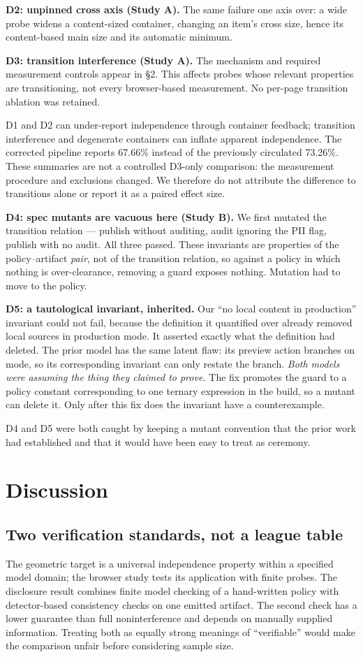 \documentclass[acmsmall,screen,review,anonymous,nonacm]{acmart}
\begin{document}
\textbf{D2: unpinned cross axis (Study A).} The same failure one axis over: a wide probe widens a content-sized container, changing an item's cross size, hence its content-based main size and its automatic minimum.

\textbf{D3: transition interference (Study A).} The mechanism and required measurement controls appear in \S2. This affects probes whose relevant properties are transitioning, not every browser-based measurement. No per-page transition ablation was retained.

D1 and D2 can under-report independence through container feedback; transition interference and degenerate containers can inflate apparent independence. The corrected pipeline reports 67.66\% instead of the previously circulated 73.26\%. These summaries are not a controlled D3-only comparison: the measurement procedure and exclusions changed. We therefore do not attribute the difference to transitions alone or report it as a paired effect size.

\textbf{D4: spec mutants are vacuous here (Study B).} We first mutated the transition relation --- publish without auditing, audit ignoring the PII flag, publish with no audit. All three passed. These invariants are properties of the policy--artifact \emph{pair}, not of the transition relation, so against a policy in which nothing is over-clearance, removing a guard exposes nothing. Mutation had to move to the policy.

\textbf{D5: a tautological invariant, inherited.} Our ``no local content in production'' invariant could not fail, because the definition it quantified over already removed local sources in production mode. It asserted exactly what the definition had deleted. The prior model has the same latent flaw: its preview action branches on mode, so its corresponding invariant can only restate the branch. \emph{Both models were assuming the thing they claimed to prove.} The fix promotes the guard to a policy constant corresponding to one ternary expression in the build, so a mutant can delete it. Only after this fix does the invariant have a counterexample.

D4 and D5 were both caught by keeping a mutant convention that the prior work had established and that it would have been easy to treat as ceremony.

\section{Discussion}
\subsection{Two verification standards, not a league table}
The geometric target is a universal independence property within a specified model domain; the browser study tests its application with finite probes. The disclosure result combines finite model checking of a hand-written policy with detector-based consistency checks on one emitted artifact. The second check has a lower guarantee than full noninterference and depends on manually supplied information. Treating both as equally strong meanings of ``verifiable'' would make the comparison unfair before considering sample size.
\end{document}
